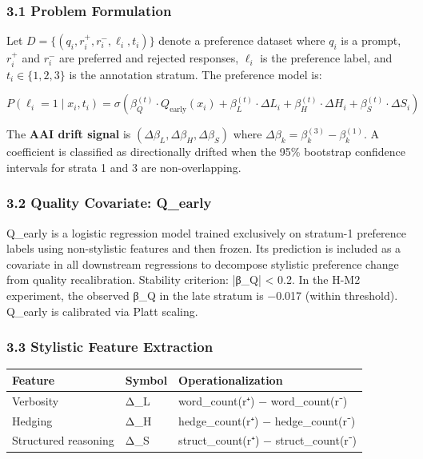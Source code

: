 
\subsubsection{3.1 Problem Formulation}

Let $D = \{(q_i, r_i^+, r_i^-, \ell_i, t_i)\}$ denote a preference dataset where $q_i$ is a prompt, $r_i^+$ and $r_i^-$ are preferred and rejected responses, $\ell_i$ is the preference label, and $t_i \in \{1, 2, 3\}$ is the annotation stratum. The preference model is:

$$P(\ell_i = 1 \mid x_i, t_i) = \sigma\!\left(\beta_Q^{(t)} \cdot Q_{\text{early}}(x_i) + \beta_L^{(t)} \cdot \Delta L_i + \beta_H^{(t)} \cdot \Delta H_i + \beta_S^{(t)} \cdot \Delta S_i\right)$$

The \textbf{AAI drift signal} is $(\Delta\beta_L, \Delta\beta_H, \Delta\beta_S)$ where $\Delta\beta_k = \beta_k^{(3)} - \beta_k^{(1)}$. A coefficient is classified as directionally drifted when the 95\% bootstrap confidence intervals for strata 1 and 3 are non-overlapping.

\subsubsection{3.2 Quality Covariate: Q_early}

Q_early is a logistic regression model trained exclusively on stratum-1 preference labels using non-stylistic features and then frozen. Its prediction is included as a covariate in all downstream regressions to decompose stylistic preference change from quality recalibration. Stability criterion: |β_Q| < 0.2. In the H-M2 experiment, the observed β_Q in the late stratum is −0.017 (within threshold). Q_early is calibrated via Platt scaling.

\subsubsection{3.3 Stylistic Feature Extraction}

\begin{table}[htbp]
\centering
\begin{tabular}{lll}
\toprule
Feature & Symbol & Operationalization \\
\midrule
Verbosity & Δ_L & word_count(r⁺) − word_count(r⁻) \\
Hedging & Δ_H & hedge_count(r⁺) − hedge_count(r⁻) \\
Structured reasoning & Δ_S & struct_count(r⁺) − struct_count(r⁻) \\
\bottomrule
\end{tabular}
\end{table}

